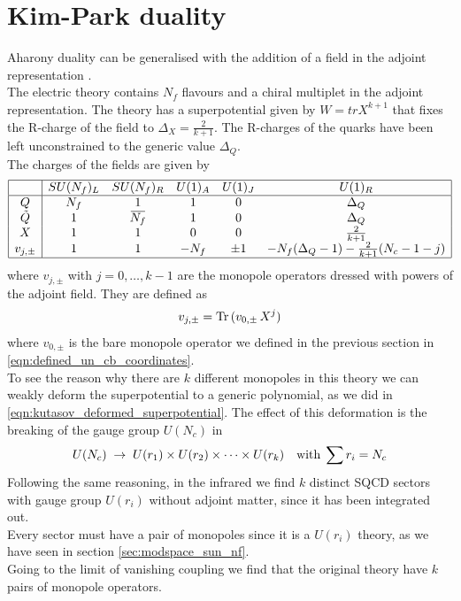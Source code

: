 \section{Kim-Park duality}
Aharony duality can be generalised with the addition of a field in the adjoint representation \cite{Kim:2013cma}.\\
The electric theory contains $N_f$ flavours and a chiral multiplet in the adjoint representation. 
The theory has a superpotential given by $W = tr X^{k+1}$ that fixes the R-charge of the field to $\Delta_X = \frac{2}{k+1}$.
The R-charges of the quarks have been left unconstrained to the generic value $\Delta_Q$.\\
The charges of the fields are given by
\begin{equation}
\begin{array}{ | c | c c c c c |}
\hline
  & SU(N_f)_L & SU(N_f)_R & U(1)_A & U(1)_J  & U(1)_R   \\
 \hline
 Q & N_f & 1& 1 & 0   & \Delta_Q  \\  
 \tilde{Q} & 1 & \overbar{N_f} & 1 & 0 & \Delta_Q      \\  
  X & 1 & 1  & 0 & 0 & \frac{2}{k+1}  \\ 
 v_{j,\pm} & 1  &1   & - N_f & \pm 1 & -N_f (\Delta_Q-1 ) - \frac{2}{k+1} (N_c-1 - j) \\
 \hline
\end{array}
\end{equation}
where $v_{j,\pm}$ with $j=0,\dotsc,k-1$ are the monopole operators dressed with powers of the adjoint field. 
They are defined as \cite{Kim:2013cma}
\begin{equation}
v_{j,\pm} = \mathrm{Tr } \,{( v_{0,\pm} \, X^{j})}
\label{eqn:3d_mag_monopoles_def}
\end{equation}
where $v_{0,\pm}$ is the bare monopole operator we defined in the previous section in \eqref{eqn:defined_un_cb_coordinates}.\\
To see the reason why there are $k$ different monopoles in this theory we can weakly deform the superpotential to a generic polynomial, as we did in \eqref{eqn:kutasov_deformed_superpotential}.
The effect of this deformation is the breaking of the gauge group $U(N_c)$ in 
\begin{equation}
U(N_c) \; \rightarrow \; U(r_1) \times U(r_2) \times \dots \times U(r_k) \quad \hbox{with} \; \sum r_i = N_c
\end{equation}
Following the same reasoning, in the infrared we find $k$ distinct SQCD sectors with gauge group $U(r_i)$ without adjoint matter, since it has been integrated out.\\
Every sector must have a pair of monopoles since it is a $U(r_i)$ theory, as we have seen in section \ref{sec:modspace_sun_nf}.\\
Going to the limit of vanishing coupling we find that the original theory have $k$ pairs of monopole operators.\\


